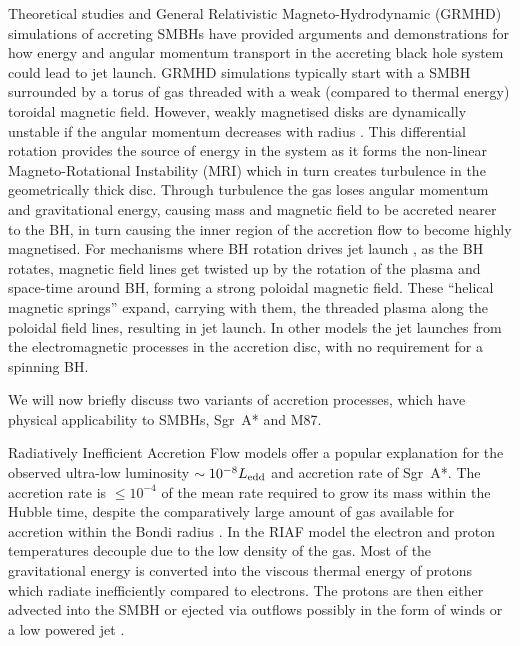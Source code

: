 Theoretical studies \citep[e.g.][]{Penrose_1969, Blandford_1977, Blandford_1982} and General Relativistic {Magneto-Hydrodynamic (GRMHD)} simulations of accreting SMBHs \citep[e.g.][]{Gammie_2003,Narayan_2012,Moscibrodzka_2013} have provided arguments and demonstrations for how energy and angular momentum transport in the accreting black hole system could lead to jet launch. GRMHD simulations typically start with a SMBH surrounded by a torus of gas threaded with a weak (compared to thermal energy) toroidal magnetic field. However, weakly magnetised disks are dynamically unstable if the angular momentum decreases with radius \citep{Balbus_1998}. This differential rotation provides the source of energy in the system as it forms the non-linear Magneto-Rotational Instability (MRI) which in turn creates turbulence in the geometrically thick disc. Through turbulence the gas loses angular momentum and gravitational energy, causing mass and magnetic field to be accreted nearer to the BH, in turn causing the inner region of the accretion flow to become highly magnetised. For mechanisms where BH rotation drives jet launch \citep[e.g.][]{Penrose_1969}, as the BH rotates, magnetic field lines get twisted up by the rotation of the plasma and space-time around BH, forming a strong poloidal magnetic  field. These ``helical magnetic springs'' \citep{Narayan_2014} expand, carrying with them, the threaded plasma along the poloidal field lines, resulting in jet launch. In other models \citep[e.g.][]{Blandford_1977, Blandford_1982} the jet launches from the electromagnetic processes in the accretion disc, with no requirement for a spinning BH. 


We will now briefly discuss two variants of accretion processes, which have physical applicability to SMBHs, Sgr~A* and M87.
 
Radiatively Inefficient Accretion Flow \citep[(RIAF),][]{Narayan_1995,Yuan_2003} models offer a popular explanation for the observed ultra-low luminosity $\sim 10^{-8} L_{\rm edd}$ and accretion rate of Sgr~A*. The accretion rate is $\le 10^{-4}$ of the mean rate required to grow its mass within the Hubble time, despite the comparatively large amount of gas available for accretion within the Bondi radius \citep{Goddi_2016}. In the RIAF model the electron and proton temperatures decouple due to the low density of the gas. Most of the gravitational energy is converted into the viscous thermal energy of protons which radiate inefficiently compared to electrons. The protons are then either advected into the SMBH \citep{Narayan_1998} or ejected via outflows possibly in the form of winds or a low powered jet \citep{Blandford_1999}. 


